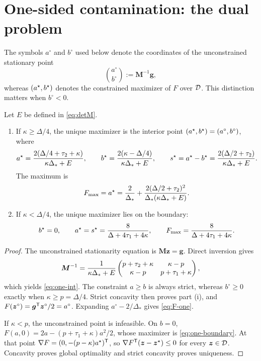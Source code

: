 \section{One-sided contamination: the dual problem}

The symbols $a^\circ$ and $b^\circ$ used below denote the coordinates of the unconstrained stationary point
\begin{equation}\label{eq:circ-def}
\binom{a^\circ}{b^\circ}:=\boldsymbol M^{-1}\boldsymbol g,
\end{equation}
whereas $(a^{\star},b^{\star})$ denotes the constrained maximizer of $F$ over $\mathcal{D}$. This distinction matters when $b^\circ<0$.

\begin{theorem}\label{thm:one-sided}
Let $E$ be defined in \eqref{eq:detM}.
\begin{enumerate}
\item[(i)] If $\kappa\ge\Delta/4$, the unique maximizer is the interior point $(a^{\star},b^{\star})=(a^\circ,b^\circ)$, where
\begin{equation}\label{eq:one-int}
a^{\star}={2(\Delta/4+\tau_2+\kappa)\over\kappa\Delta_*+E},\qquad
b^{\star}={2(\kappa-\Delta/4)\over\kappa\Delta_*+E},\qquad
s^{\star}=a^{\star}-b^{\star}={2(\Delta/2+\tau_2)\over\kappa\Delta_*+E}.
\end{equation}
The maximum is
\begin{equation}\label{eq:F-one}
F_{\max}=a^{\star}={2\over\Delta_*}+{2(\Delta/2+\tau_2)^2\over\Delta_*(\kappa\Delta_*+E)}.
\end{equation}
\item[(ii)] If $\kappa<\Delta/4$, the unique maximizer lies on the boundary:
\begin{equation}\label{eq:one-boundary}
b^{\star}=0,
\qquad
a^{\star}=s^{\star}={8\over\Delta+4\tau_1+4\kappa},
\qquad
F_{\max}={8\over\Delta+4\tau_1+4\kappa}.
\end{equation}
\end{enumerate}
\end{theorem}
\begin{proof}
The unconstrained stationarity equation is $\boldsymbol M\boldsymbol z=\boldsymbol g$. Direct inversion gives
\[
\boldsymbol M^{-1}={1\over\kappa\Delta_*+E}
\begin{pmatrix}p+\tau_2+\kappa&\kappa-p\\\kappa-p&p+\tau_1+\kappa\end{pmatrix},
\]
which yields \eqref{eq:one-int}. The constraint $a\ge b$ is always strict, whereas $b^\circ\ge0$ exactly when $\kappa\ge p=\Delta/4$. Strict concavity then proves part (i), and $F(\boldsymbol z^\circ)=\boldsymbol g^{\mathsf{T}}\boldsymbol z^\circ/2=a^\circ$. Expanding $a^\circ-2/\Delta_*$ gives \eqref{eq:F-one}.

If $\kappa<p$, the unconstrained point is infeasible. On $b=0$,
$F(a,0)=2a-(p+\tau_1+\kappa)a^2/2$, whose maximizer is \eqref{eq:one-boundary}. At that point
$\nabla F=(0,-(p-\kappa)a^{\star})^{\mathsf{T}}$, so
$\nabla F^{\mathsf{T}}(\boldsymbol z-\boldsymbol z^\star)\le0$ for every $\boldsymbol z\in\mathcal{D}$. Concavity proves global optimality and strict concavity proves uniqueness.
\end{proof}

